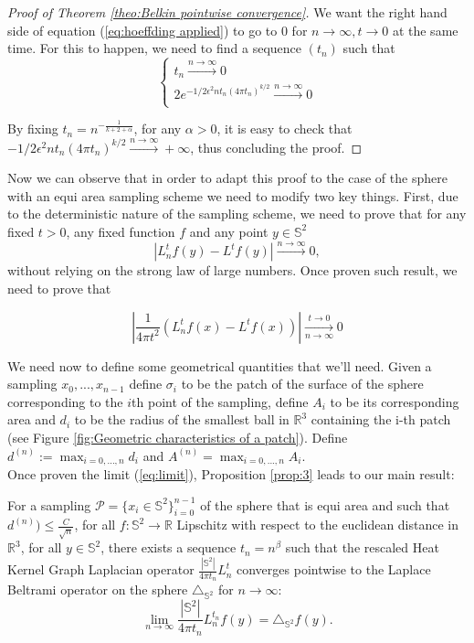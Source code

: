 \begin{proof}[Proof of Theorem \ref{theo:Belkin pointwise convergence}]
We want the right hand side of equation (\ref{eq:hoeffding applied}) to go to $0$ for $n\to\infty, t\to0$ at the same time. For this to happen, we need to find a sequence $(t_n)$ such that 
$$\begin{cases}
t_n\xrightarrow{n\to\infty}0\\
2 e^{-1 / 2 \epsilon^{2} n t_n(4 \pi t_n)^{k / 2}}\xrightarrow{n\to\infty}0\\
\end{cases}$$

By fixing $t_n=n^{-\frac{1}{k+2+\alpha}}$, for any $\alpha>0$, it is easy to check that \\$-1 / 2 \epsilon^{2} n t_n(4 \pi t_n)^{k / 2}\xrightarrow{n\to\infty}+\infty$, thus concluding the proof.

\end{proof}

Now we can observe that in order to adapt this proof to the case of the sphere with an equi area sampling scheme we need to modify two key things. First, due to the deterministic nature of the sampling scheme, we need to prove that for any fixed $t>0$, any fixed function $f$ and any point $y\in\mathbb S^2$ 
\begin{equation}\label{eq:limit}
	\left|L_n^tf(y)-L^tf(y)\right|\xrightarrow{n\to \infty} 0,
\end{equation}
without relying on the strong law of large numbers. Once proven such result, we need to prove that

$$\left|\frac{1}{4\pi t^2}\left(L_n^tf(x) - L^tf(x)\right)\right|\xrightarrow[n\to \infty]{t\to 0}0$$

We need now to define some geometrical quantities that we'll need. Given a sampling $x_0, ..., x_{n-1}$ define $\sigma_i$ to be the patch of the surface of the sphere corresponding to the $i$th point of the sampling, define $A_i$ to be its corresponding area and $d_i$ to be the radius of the smallest ball in $\mathbb R^3$ containing the i-th patch (see Figure \ref{fig:Geometric characteristics of a patch}). Define $d^{(n)} := \max_{i=0, ..., n}d_i$ and $A^{(n)}=\max_{i=0, ..., n}A_i$.\\
Once proven the limit (\ref{eq:limit}), Proposition \ref{prop:3} leads to our main result:
\vspace{1cm}
\begin{snugshade*}
	\begin{theorem}
		For a sampling $\mathcal P = \{x_i\in\mathbb S^2\}_{i=0}^{n-1}$ of the sphere that is equi area and such that $d^{(n)})\leq \frac{C}{\sqrt{n}}$, for all $f: \mathbb S^2 \rightarrow \mathbb R$ Lipschitz with respect to the euclidean distance in $\mathbb R^3$, for all $y\in\mathbb S^2$, there exists a sequence $t_n = n^\beta$ such that the rescaled Heat Kernel Graph Laplacian operator $\frac{|\mathbb S^2|}{4\pi t_n}L^t_n$ converges pointwise to the Laplace Beltrami operator on the sphere $\triangle_{\mathbb S^2}$  for $n\to\infty$:
		$$ \lim_{n\to\infty}\frac{|\mathbb S^2|}{4\pi t_n} L_n^{t_n}f(y) =  \triangle_{\mathbb S^2}f(y).$$
		\label{theo:pointwise convergence in the healpix case}
	\end{theorem}
\end{snugshade*}

